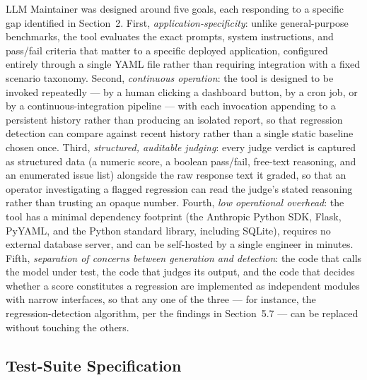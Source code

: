 \documentclass[11pt,a4paper]{article}
\begin{document}
LLM Maintainer was designed around five goals, each responding to a
specific gap identified in Section~2. First,
\emph{application-specificity}: unlike general-purpose benchmarks, the
tool evaluates the exact prompts, system instructions, and pass/fail
criteria that matter to a specific deployed application, configured
entirely through a single YAML file rather than requiring integration
with a fixed scenario taxonomy. Second, \emph{continuous operation}: the
tool is designed to be invoked repeatedly --- by a human clicking a
dashboard button, by a cron job, or by a continuous-integration pipeline
--- with each invocation appending to a persistent history rather than
producing an isolated report, so that regression detection can compare
against recent history rather than a single static baseline chosen once.
Third, \emph{structured, auditable judging}: every judge verdict is
captured as structured data (a numeric score, a boolean pass/fail,
free-text reasoning, and an enumerated issue list) alongside the raw
response text it graded, so that an operator investigating a flagged
regression can read the judge's stated reasoning rather
than trusting an opaque number. Fourth, \emph{low operational overhead}:
the tool has a minimal dependency footprint (the Anthropic Python SDK,
Flask, PyYAML, and the Python standard library, including SQLite),
requires no external database server, and can be self-hosted by a single
engineer in minutes. Fifth, \emph{separation of concerns between
generation and detection}: the code that calls the model under test, the
code that judges its output, and the code that decides whether a score
constitutes a regression are implemented as independent modules with
narrow interfaces, so that any one of the three --- for instance, the
regression-detection algorithm, per the findings in Section~5.7 --- can
be replaced without touching the others.

\subsection{Test-Suite Specification}
\end{document}
